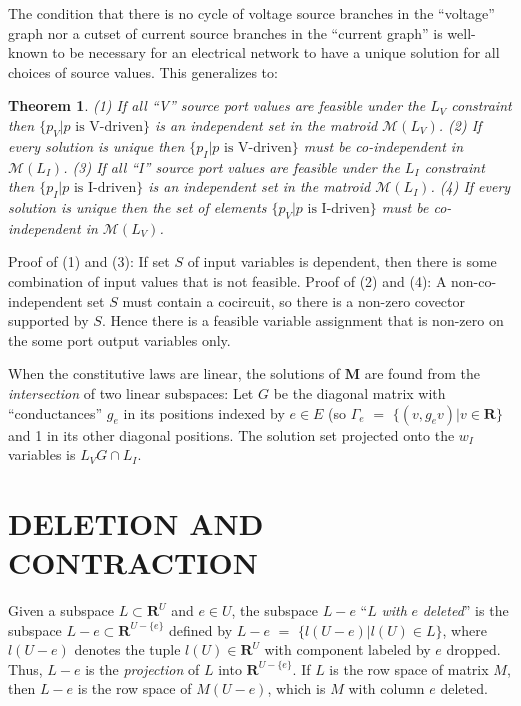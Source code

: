 \documentclass{article}
\def\Reals{\ensuremath{\mathbf R}}
\newtheorem{theorem}{Theorem}
\begin{document}
The condition that there is no cycle of voltage source branches 
in the ``voltage'' graph nor a
cutset of current source branches in the ``current graph''
is well-known to be necessary for 
an electrical network to have a unique 
solution for all choices of source values.
This generalizes to:



\begin{theorem}
\label{Feasiblity1}
(1) If all ``V'' source port values are feasible under
the $L_V$ constraint then 
$\{p_V|p \mbox{\ is V-driven}\}$
is an independent set in the matroid $\mathcal{M}(L_V)$.
(2) If every solution is unique then 
$\{p_I|p \mbox{\ is V-driven}\}$
must be co-independent in $\mathcal{M}(L_I)$.
(3) If all ``I'' source port values are feasible under
the $L_I$ constraint then 
$\{p_I|p \mbox{\ is I-driven}\}$
is an independent set in the matroid $\mathcal{M}(L_I)$.
(4) If every solution is unique 
then the set of elements
$\{p_V|p \mbox{\ is I-driven}\}$
must be co-independent in $\mathcal{M}(L_V)$.
\end{theorem}

Proof of (1) and (3):
If set $S$ of input variables is dependent, then there is
some combination of input values that is not feasible.
Proof of (2) and (4):
A non-co-independent set $S$ must contain a cocircuit, so
there is a non-zero covector supported by $S$.  Hence there is a 
feasible variable assignment that is non-zero on the some port output
variables only.


When the constitutive laws are linear, the solutions of $\textbf{M}$ are
found from the \textit{intersection} of two linear subspaces:  Let $G$ 
be the diagonal matrix with ``conductances'' $g_e$ in its positions
indexed by $e \in E$ (so $\Gamma_e$ $=$ $\{ (v, g_e v) | v \in \Reals \}$
and 1 in its other diagonal positions.  The solution set projected onto
the $w_I$ variables is $L_VG\cap L_I$.

\section{DELETION AND CONTRACTION}

Given a subspace $L\subset\Reals^U$ and $e\in U$, the subspace $L-e$ 
``$L$ \textit{with} $e$ \textit{deleted}'' is the
subspace $L-e\subset\Reals^{U-\{e\}}$ defined by $L-e$ $=$
$\{ l(U-e) | l(U)\in L\}$, where $l(U-e)$ denotes the tuple $l(U)\in\Reals^U$
with component labeled by $e$ dropped.  
Thus, $L-e$ is the \textit{projection} of $L$ into $\Reals^{U-\{e\}}$.
If $L$ is the row space of matrix $M$,
then $L-e$ is the row space of $M(U-e)$, which is $M$ with column $e$ deleted.
\end{document}
